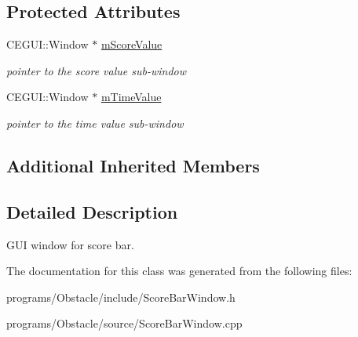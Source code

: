 \subsection*{Protected Attributes}
\begin{DoxyCompactItemize}
\item 
C\+E\+G\+U\+I\+::\+Window $\ast$ \hyperlink{class_n_c_t_u_1_1_score_bar_window_a6bd9be8ccd02bb9954b214806dff87a7}{m\+Score\+Value}\hypertarget{class_n_c_t_u_1_1_score_bar_window_a6bd9be8ccd02bb9954b214806dff87a7}{}\label{class_n_c_t_u_1_1_score_bar_window_a6bd9be8ccd02bb9954b214806dff87a7}

\begin{DoxyCompactList}\small\item\em pointer to the score value sub-\/window \end{DoxyCompactList}\item 
C\+E\+G\+U\+I\+::\+Window $\ast$ \hyperlink{class_n_c_t_u_1_1_score_bar_window_acd0f1e39530c6ce908aea8fdad80d8ec}{m\+Time\+Value}\hypertarget{class_n_c_t_u_1_1_score_bar_window_acd0f1e39530c6ce908aea8fdad80d8ec}{}\label{class_n_c_t_u_1_1_score_bar_window_acd0f1e39530c6ce908aea8fdad80d8ec}

\begin{DoxyCompactList}\small\item\em pointer to the time value sub-\/window \end{DoxyCompactList}\end{DoxyCompactItemize}
\subsection*{Additional Inherited Members}


\subsection{Detailed Description}
G\+UI window for score bar. 

The documentation for this class was generated from the following files\+:\begin{DoxyCompactItemize}
\item 
programs/\+Obstacle/include/Score\+Bar\+Window.\+h\item 
programs/\+Obstacle/source/Score\+Bar\+Window.\+cpp\end{DoxyCompactItemize}
